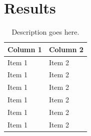 \documentclass[11pt]{article}
\begin{document}
\begin{multicols}{2}


      \label{sec:results}
      \section{Results}

      \begin{table}[H]
            \centering
            \setlength{\tabcolsep}{3pt}
            \caption{Description goes here.}
            \begin{tabularx}{\linewidth}{lY}
                \toprule
                Column 1 & Column 2 \\
                \midrule
                Item 1 & Item 2 \\
                Item 1 & Item 2 \\
                Item 1 & Item 2 \\
                Item 1 & Item 2 \\
                Item 1 & Item 2 \\
                Item 1 & Item 2 \\
                \bottomrule
            \end{tabularx}
            \label{tab:results}
        \end{table}


\end{multicols}
\end{document}
